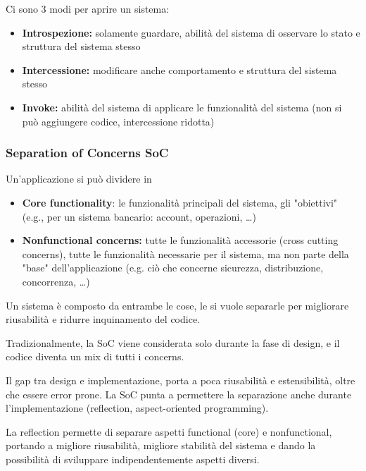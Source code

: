 Ci sono 3 modi per aprire un sistema:
\begin{itemize}
	\item \textbf{Introspezione:} solamente guardare, abilità del sistema di osservare lo stato e struttura del sistema stesso
	
	\item \textbf{Intercessione:} modificare anche comportamento e struttura del sistema stesso
	
	\item \textbf{Invoke:} abilità del sistema di applicare le funzionalità del sistema (non si può aggiungere codice, intercessione ridotta)
\end{itemize}

\subsubsection{Separation of Concerns SoC}

Un'applicazione si può dividere in
\begin{itemize}
	\item \textbf{Core functionality}: le funzionalità principali del sistema, gli "obiettivi" (e.g., per un sistema bancario: account, operazioni, \dots)
	
	\item \textbf{Nonfunctional concerns:} tutte le funzionalità accessorie (cross cutting concerns), tutte le funzionalità necessarie per il sistema, ma non parte della "base" dell'applicazione (e.g. ciò che concerne sicurezza, distribuzione, concorrenza, \dots)
\end{itemize}
Un sistema è composto da entrambe le cose, le si vuole separarle per migliorare riusabilità e ridurre inquinamento del codice.

Tradizionalmente, la SoC viene considerata solo durante la fase di design, e il codice diventa un mix di tutti i concerns. 

Il gap tra design e implementazione, porta a poca riusabilità e estensibilità, oltre che essere error prone. La SoC punta a permettere la separazione anche durante l'implementazione (reflection, aspect-oriented programming).

La reflection permette di separare aspetti functional (core) e nonfunctional, portando a migliore riusabilità, migliore stabilità del sistema e dando la possibilità di sviluppare indipendentemente aspetti diversi.


